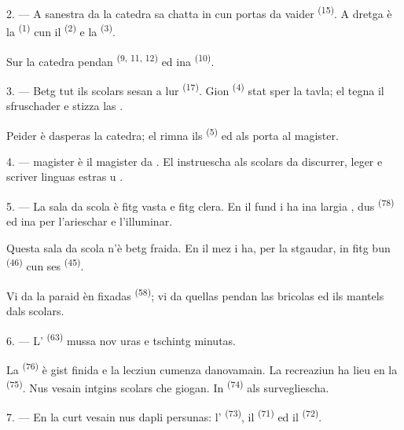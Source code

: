 2. --- A sanestra da la catedra sa chatta in  cun portas da vaider
\textsuperscript{(15)}. A dretga è la  \textsuperscript{(1)} cun
il  \textsuperscript{(2)} e la 
\textsuperscript{(3)}.

Sur la catedra pendan  \textsuperscript{(9, 11, 12)} ed ina
 \textsuperscript{(10)}.

3. --- Betg tut ils scolars sesan a lur  \textsuperscript{(17)}. Gion
\textsuperscript{(4)} stat sper la tavla; el tegna il sfruschader e stizza las
.

Peider è dasperas la catedra; el rimna ils 
\textsuperscript{(5)} ed als porta al magister.

4. ---  magister è il magister da . El
instruescha als scolars da discurrer, leger e scriver linguas estras
 u .

5. --- La sala da scola è fitg vasta e fitg clera. En il fund i ha ina largia
, dus  \textsuperscript{(78)} ed ina  per l'arieschar e l'illuminar.

Questa sala da scola n'è betg fraida. En il mez i ha, per la stgaudar, in fitg bun
 \textsuperscript{(46)} cun ses  \textsuperscript{(45)}.

Vi da la paraid èn fixadas  \textsuperscript{(58)}; vi
da quellas pendan las bricolas ed ils mantels dals scolars.

\VUsaut{5.2mm}
\VUsaut{3.6mm}

6. --- L' \textsuperscript{(63)} mussa nov uras e tschintg minutas.

La  \textsuperscript{(76)} è gist finida e la lecziun cumenza
danovamain. La recreaziun ha lieu en la  \textsuperscript{(75)}. Nus
vesain intgins scolars che giogan. In  \textsuperscript{(74)}
als survegliescha.

7. --- En la curt vesain nus dapli persunas: l'
\textsuperscript{(73)}, il  \textsuperscript{(71)} ed il
 \textsuperscript{(72)}.

